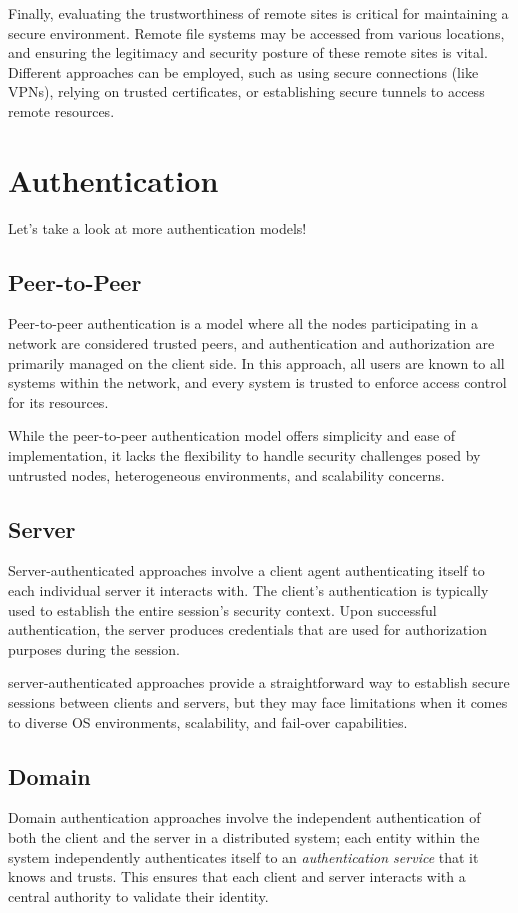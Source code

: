 \documentclass{report}
\newcommand{\corollaryBegin}[1]{\begin{tcolorbox}[colback=teal!5!white,colframe=black!75!teal,title={Corollary:
      #1}]}
\newcommand{\corollaryEnd}{\end{tcolorbox}}
\begin{document}
Finally, evaluating the trustworthiness of remote sites is critical for maintaining a secure
environment. Remote file systems may be accessed from various locations, and ensuring the legitimacy
and security posture of these remote sites is vital. Different approaches can be employed, such as
using secure connections (like VPNs), relying on trusted certificates, or establishing secure
tunnels to access remote resources. 





\section{Authentication}
Let's take a look at more authentication models!

\subsection{Peer-to-Peer}
Peer-to-peer authentication is a model where all the nodes participating in a network are considered
trusted peers, and authentication and authorization are primarily managed on the client side. In
this approach, all users are known to all systems within the network, and every system is trusted to
enforce access control for its resources. 

\corollaryBegin{Dis/Advantages}
While the peer-to-peer authentication model offers simplicity and ease of implementation, it lacks
the flexibility to handle security challenges posed by untrusted nodes, heterogeneous environments,
and scalability concerns.
\corollaryEnd


\subsection{Server}
Server-authenticated approaches involve a client agent authenticating itself to each individual
server it interacts with. The client's authentication is typically used to establish the entire
session's security context. Upon successful authentication, the server produces credentials that are
used for authorization purposes during the session. 

\corollaryBegin{Dis/Advantages}
server-authenticated approaches provide a straightforward way to establish secure sessions between
clients and servers, but they may face limitations when it comes to diverse OS environments,
scalability, and fail-over capabilities.
\corollaryEnd


\subsection{Domain}
Domain authentication approaches involve the independent authentication of both the client and the
server in a distributed system; each entity within the system independently authenticates itself to
an \textit{authentication service} that it knows and trusts. This ensures that each client and server
interacts with a central authority to validate their identity.
\end{document}
